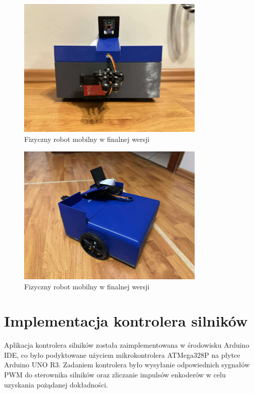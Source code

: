 \begin{figure}[H]
  \centering
  \includegraphics[width=0.8\textwidth]{./graf/full-front}
  \caption{Fizyczny robot mobilny w finalnej wersji}
\end{figure}

\begin{figure}[H]
  \centering
  \includegraphics[width=0.8\textwidth]{./graf/full-back}
  \caption{Fizyczny robot mobilny w finalnej wersji}
\end{figure}


\clearpage

\section{Implementacja kontrolera silników}

Aplikacja kontrolera silników została zaimplementowana w środowisku Arduino IDE, co było podyktowane użyciem mikrokontrolera ATMega328P na płytce Arduino UNO R3. Zadaniem kontrolera było wysyłanie odpowiednich sygnałów PWM do sterownika silników oraz zliczanie impulsów enkoderów w celu uzyskania pożądanej dokładności. 

